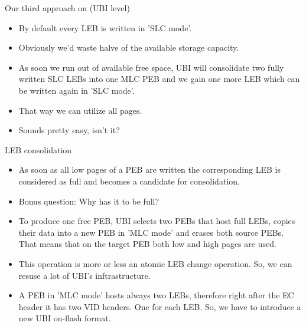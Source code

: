 \documentclass[aspectratio=169,obeyspaces,spaces,hyphens,dvipsnames]{beamer}
\begin{document}
\begin{frame}{Our third approach on (UBI level)}
  \begin{itemize}
  \item By default every LEB is written in 'SLC mode'.
  \item Obviously we'd waste halve of the available storage capacity.
  \item As soon we run out of available free space, UBI will consolidate two fully written SLC LEBs
        into one MLC PEB and we gain one more LEB which can be written again in 'SLC mode'.
  \item That way we can utilize all pages.
  \item Sounds pretty easy, isn't it?
  \end{itemize}
\end{frame}

\begin{frame}{LEB consolidation}
  \begin{itemize}
  \item As soon as all low pages of a PEB are written the corresponding LEB is considered as full
        and becomes a candidate for consolidation.
  \item Bonus question: Why has it to be full?
  \item To produce one free PEB, UBI selects two PEBs that host full LEBs, copies their data
        into a new PEB in 'MLC mode' and erases both source PEBs.
        That means that on the target PEB both low and high pages
        are used.
  \item This operation is more or less an atomic LEB change operation. So, we can resuse a lot of
        UBI's inftrastructure.
  \item A PEB in 'MLC mode' hosts always two LEBs, therefore right after the EC header it has
        two VID headers. One for each LEB. So, we have to introduce a new UBI on-flash format.
  \end{itemize}
\end{frame}
\end{document}
